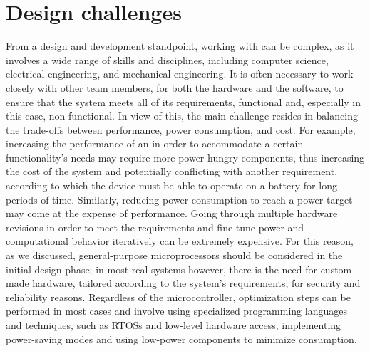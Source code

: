 \section{Design challenges}
From a design and development standpoint, working with \ess can be complex, as it involves a wide range of skills and disciplines, including computer science, electrical engineering, and mechanical engineering. It is often necessary to work closely with other team members, for both the hardware and the software, to ensure that the system meets all of its requirements, functional and, especially in this case, non-functional. 
In view of this, the main challenge resides in balancing the trade-offs between performance, power consumption, and cost.
For example, increasing the performance of an \es in order to accommodate a certain functionality's needs may require more power-hungry components, thus increasing the cost of the system and potentially conflicting with another requirement, according to which the device must be able to operate on a battery for long periods of time. Similarly, reducing power consumption to reach a power target may come at the expense of performance. 
Going through multiple hardware revisions in order to meet the requirements and fine-tune power and computational behavior iteratively can be extremely expensive. For this reason, as we discussed, general-purpose microprocessors should be considered in the initial design phase; in most real systems however, there is the need for custom-made hardware, tailored according to the system's requirements, for security and reliability reasons.
Regardless of the microcontroller, optimization steps can be performed in most cases and involve using specialized programming languages and techniques, such as RTOSs and low-level hardware access, implementing power-saving modes and using low-power components to minimize consumption.

